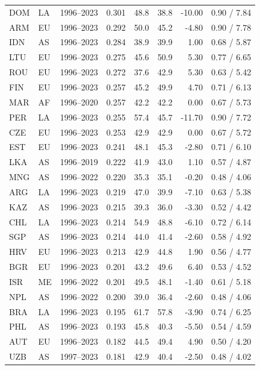 \begin{tabular}{llrrrrrr}
DOM & LA & 1996--2023 & 0.301 & 48.8 & 38.8 & -10.00 & 0.90 / 7.84 \\
ARM & EU & 1996--2023 & 0.292 & 50.0 & 45.2 & -4.80 & 0.90 / 7.78 \\
IDN & AS & 1996--2023 & 0.284 & 38.9 & 39.9 & 1.00 & 0.68 / 5.87 \\
LTU & EU & 1996--2023 & 0.275 & 45.6 & 50.9 & 5.30 & 0.77 / 6.65 \\
ROU & EU & 1996--2023 & 0.272 & 37.6 & 42.9 & 5.30 & 0.63 / 5.42 \\
FIN & EU & 1996--2023 & 0.257 & 45.2 & 49.9 & 4.70 & 0.71 / 6.13 \\
MAR & AF & 1996--2020 & 0.257 & 42.2 & 42.2 & 0.00 & 0.67 / 5.73 \\
PER & LA & 1996--2023 & 0.255 & 57.4 & 45.7 & -11.70 & 0.90 / 7.72 \\
CZE & EU & 1996--2023 & 0.253 & 42.9 & 42.9 & 0.00 & 0.67 / 5.72 \\
EST & EU & 1996--2023 & 0.241 & 48.1 & 45.3 & -2.80 & 0.71 / 6.10 \\
LKA & AS & 1996--2019 & 0.222 & 41.9 & 43.0 & 1.10 & 0.57 / 4.87 \\
MNG & AS & 1996--2022 & 0.220 & 35.3 & 35.1 & -0.20 & 0.48 / 4.06 \\
ARG & LA & 1996--2023 & 0.219 & 47.0 & 39.9 & -7.10 & 0.63 / 5.38 \\
KAZ & AS & 1996--2023 & 0.215 & 39.3 & 36.0 & -3.30 & 0.52 / 4.42 \\
CHL & LA & 1996--2023 & 0.214 & 54.9 & 48.8 & -6.10 & 0.72 / 6.14 \\
SGP & AS & 1996--2023 & 0.214 & 44.0 & 41.4 & -2.60 & 0.58 / 4.92 \\
HRV & EU & 1996--2023 & 0.213 & 42.9 & 44.8 & 1.90 & 0.56 / 4.77 \\
BGR & EU & 1996--2023 & 0.201 & 43.2 & 49.6 & 6.40 & 0.53 / 4.52 \\
ISR & ME & 1996--2022 & 0.201 & 49.5 & 48.1 & -1.40 & 0.61 / 5.18 \\
NPL & AS & 1996--2022 & 0.200 & 39.0 & 36.4 & -2.60 & 0.48 / 4.06 \\
BRA & LA & 1996--2023 & 0.195 & 61.7 & 57.8 & -3.90 & 0.74 / 6.25 \\
PHL & AS & 1996--2023 & 0.193 & 45.8 & 40.3 & -5.50 & 0.54 / 4.59 \\
AUT & EU & 1996--2023 & 0.182 & 44.5 & 49.4 & 4.90 & 0.50 / 4.20 \\
UZB & AS & 1997--2023 & 0.181 & 42.9 & 40.4 & -2.50 & 0.48 / 4.02 \\

\end{tabular}

